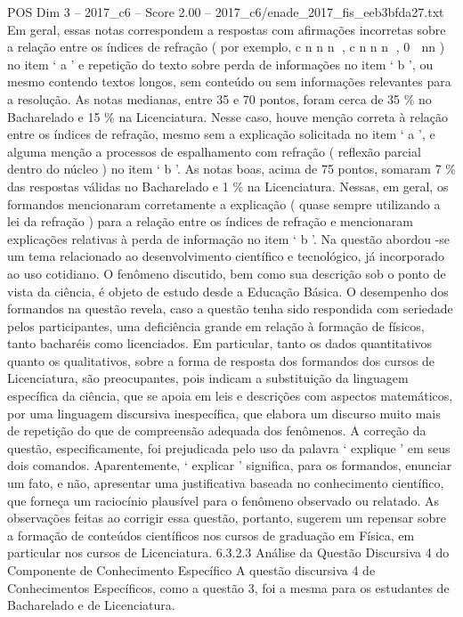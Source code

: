 \begin{textsample}{POS Dim 3 – 2017\_c6 – Score 2.00 – 2017\_c6/enade\_2017\_fis\_eeb3bfda27.txt}
Em geral, essas notas correspondem a respostas com afirmações incorretas sobre a relação entre os índices de refração ( por exemplo, c n n n , c n n n , 0  nn ) no item ‘ a ’ e repetição do texto sobre perda de informações no item ‘ b ’, ou mesmo contendo textos longos, sem conteúdo ou sem informações relevantes para a resolução.
As notas medianas, entre 35 e 70 pontos, foram cerca de 35 \% no Bacharelado e 15 \% na Licenciatura.
Nesse caso, houve menção correta à relação entre os índices de refração, mesmo sem a explicação solicitada no item ‘ a ’, e alguma menção a processos de espalhamento com refração ( reflexão parcial dentro do núcleo ) no item ‘ b ’.
As notas boas, acima de 75 pontos, somaram 7 \% das respostas válidas no Bacharelado e 1 \% na Licenciatura.
Nessas, em geral, os formandos mencionaram corretamente a explicação ( quase sempre utilizando a lei da refração ) para a relação entre os índices de refração e mencionaram explicações relativas à perda de informação no item ‘ b ’.
Na questão abordou -se um tema relacionado ao desenvolvimento científico e tecnológico, já incorporado ao uso cotidiano.
O fenômeno discutido, bem como sua descrição sob o ponto de vista da ciência, é objeto de estudo desde a Educação Básica.
O desempenho dos formandos na questão revela, caso a questão tenha sido respondida com seriedade pelos participantes, uma deficiência grande em relação à formação de físicos, tanto bacharéis como licenciados.
Em particular, tanto os dados quantitativos quanto os qualitativos, sobre a forma de resposta dos formandos dos cursos de Licenciatura, são preocupantes, pois indicam a substituição da linguagem específica da ciência, que se apoia em leis e descrições com aspectos matemáticos, por uma linguagem discursiva inespecífica, que elabora um discurso muito mais de repetição do que de compreensão adequada dos fenômenos.
A correção da questão, especificamente, foi prejudicada pelo uso da palavra ‘ explique ’ em seus dois comandos.
Aparentemente, ‘ explicar ’ significa, para os formandos, enunciar um fato, e não, apresentar uma justificativa baseada no conhecimento científico, que forneça um raciocínio plausível para o fenômeno observado ou relatado.
As observações feitas ao corrigir essa questão, portanto, sugerem um repensar sobre a formação de conteúdos científicos nos cursos de graduação em Física, em particular nos cursos de Licenciatura. 6.3.2.3 Análise da Questão Discursiva 4 do Componente de Conhecimento Específico A questão discursiva 4 de Conhecimentos Específicos, como a questão 3, foi a mesma para os estudantes de Bacharelado e de Licenciatura.

\end{textsample}
